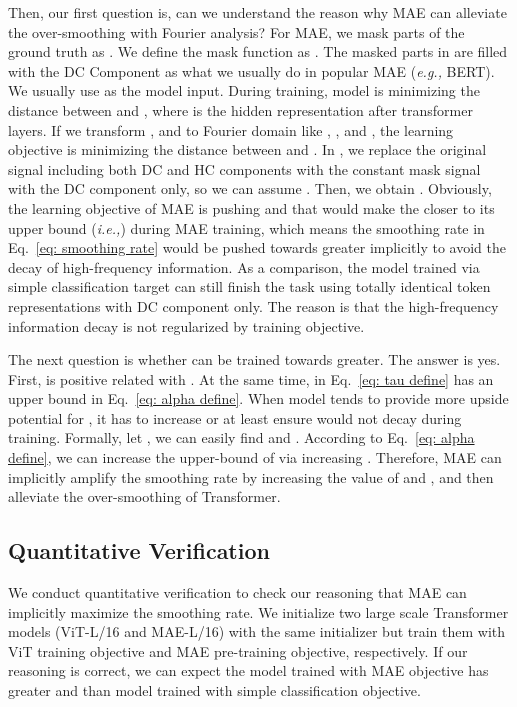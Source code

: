 \documentclass{article}
\theoremstyle{plain}
\theoremstyle{definition}
\theoremstyle{remark}
\newcommand{\ie}{\emph{i.e.,}\xspace}
\newcommand{\eg}{\emph{e.g.,}\xspace}
\begin{document}
Then, our first question is, can we understand the reason why MAE can alleviate the over-smoothing with Fourier analysis? For MAE, we mask parts of the ground truth  as . We define the mask function as . The masked parts in  are filled with the DC Component as what we usually do in popular MAE (\eg BERT). We usually use  as the model input. During training, model is minimizing the distance between  and , where  is the hidden representation after  transformer layers. If we transform ,  and  to Fourier domain like , , and , the learning objective is minimizing the distance between  and . In , we replace the original signal including both DC and HC components with the constant mask signal with the DC component only, so we can assume . Then, we obtain . Obviously, the learning objective of MAE is pushing  and that would make the  closer to its upper bound (\ie ) during MAE training, which means the smoothing rate  in Eq.~\ref{eq: smoothing rate} would be pushed towards greater implicitly to avoid the decay of high-frequency information. As a comparison, the model trained via simple classification target can still finish the task using totally identical token representations with DC component only. The reason is that the high-frequency information decay is not regularized by training objective.

The next question is whether  can be trained towards greater. The answer is yes. First,  is positive related with . At the same time,  in Eq.~\ref{eq: tau define} has an upper bound in Eq.~\ref{eq: alpha define}.
When model tends to provide more upside potential for , it has to increase  or at least ensure  would not decay during training.
Formally, let , we can easily find  and . According to Eq.~\ref{eq: alpha define}, we can increase the upper-bound of  via increasing . Therefore, MAE can implicitly amplify the smoothing rate by increasing the value of  and , and then alleviate the over-smoothing of Transformer.


\subsection{Quantitative Verification}\label{sec: quantitative verification}

We conduct quantitative verification to check our reasoning that MAE can implicitly maximize the smoothing rate. We initialize two large scale Transformer models (ViT-L/16 and MAE-L/16) with the same initializer but train them with ViT training objective and MAE pre-training objective, respectively. If our reasoning is correct, we can expect the model trained with MAE objective has greater  and  than model trained with simple classification objective.
\end{document}
